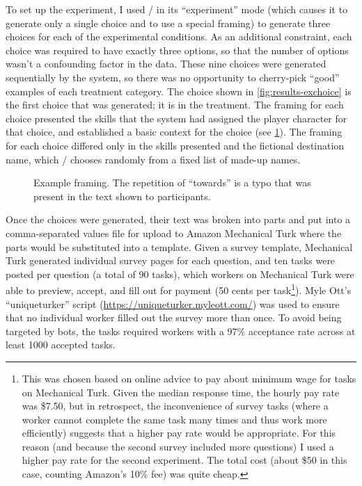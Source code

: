 To set up the experiment, I used \dunyazad/ in its ``experiment'' mode (which causes it to generate only a single choice and to use a special framing) to generate three choices for each of the experimental conditions.
%
As an additional constraint, each choice was required to have exactly three options, so that the number of options wasn't a confounding factor in the data.
%
These nine choices were generated sequentially by the system, so there was no opportunity to cherry-pick ``good'' examples of each treatment category.
%
The choice shown in \cref{fig:results-exchoice} is the first choice that was generated; it is in the \dlm{} treatment.
%
The framing for each choice presented the skills that the system had assigned the player character for that choice, and established a basic context for the choice (see \cref{fig:exframing}).
%
The framing for each choice differed only in the skills presented and the fictional destination name, which \dunyazad/ chooses randomly from a fixed list of made-up names.


\begin{figure}[!h]
\caption[Example framing]{Example framing. The repetition of ``towards'' is a typo that was present in the text shown to participants.}
  \label{fig:exframing}
\end{figure}


Once the choices were generated, their text was broken into parts and put into a comma-separated values file for upload to Amazon Mechanical Turk where the parts would be substituted into a template.
%
Given a survey template, Mechanical Turk generated individual survey pages for each question, and ten tasks were posted per question (a total of 90 tasks), which workers on Mechanical Turk were able to preview, accept, and fill out for payment (50 cents per task\footnote{
%
This was chosen based on online advice to pay about minimum wage for tasks on Mechanical Turk.
%
Given the median response time, the hourly pay rate was \$7.50, but in retrospect, the inconvenience of survey tasks (where a worker cannot complete the same task many times and thus work more efficiently) suggests that a higher pay rate would be appropriate.
%
For this reason (and because the second survey included more questions) I used a higher pay rate for the second experiment.
%
The total cost (about \$50 in this case, counting Amazon's 10\% fee) was quite cheap.}).
%
Myle Ott's ``uniqueturker'' script (\url{https://uniqueturker.myleott.com/}) was used to ensure that no individual worker filled out the survey more than once.
%
To avoid being targeted by bots, the tasks required workers with a 97\% acceptance rate across at least 1000 accepted tasks.

